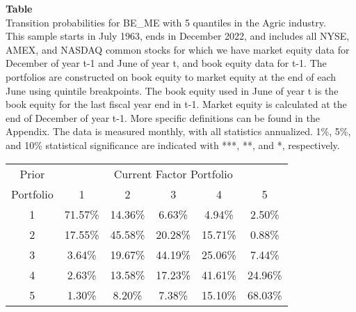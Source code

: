 \begin{table*}[ht!]
\raggedright
{}
\label{tab: transition_probs_BE_ME_Agric_with_5_quantiles}
\textbf{Table \thetable} \\
Transition probabilities for BE_ME with 5 quantiles in the Agric industry. \\
\hspace*{1em}This sample starts in July 1963, ends in December 2022, and includes all NYSE, AMEX, and NASDAQ common stocks for which we have market equity data for December of year t-1 and June of year t, and book equity data for t-1. The portfolios are constructed on book equity to market equity at the end of each June using quintile breakpoints.  The book equity used in June of year t is the book equity for the last fiscal year end in t-1.  Market equity is calculated at the end of December of year t-1.  More specific definitions can be found in the Appendix.  The data is measured monthly, with all statistics annualized.  1\%, 5\%, and 10\% statistical significance are indicated with ***, **, and *, respectively. \\
\vspace{0.5em}
\centering
\begin{adjustbox}{max width=\textwidth}
\begin{tabular}{@{}cccccc@{}}
\toprule
Prior & \multicolumn{5}{c}{Current Factor Portfolio} \\
Portfolio & 1 & 2 & 3 & 4 & 5 \\
\midrule
1 & 71.57\% & 14.36\% & 6.63\% & 4.94\% & 2.50\% \\
2 & 17.55\% & 45.58\% & 20.28\% & 15.71\% & 0.88\% \\
3 & 3.64\% & 19.67\% & 44.19\% & 25.06\% & 7.44\% \\
4 & 2.63\% & 13.58\% & 17.23\% & 41.61\% & 24.96\% \\
5 & 1.30\% & 8.20\% & 7.38\% & 15.10\% & 68.03\% \\
\bottomrule
\end{tabular}
\end{adjustbox}
\end{table*}